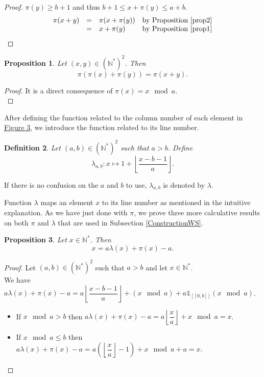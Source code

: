 \documentclass{article}
\newtheorem{definition}{Definition}[section]
\newtheorem{computational theorem}[definition]{Computational Theorem}
\newtheorem{proposition}[definition]{Proposition}
\begin{document}
\begin{proof}
\(\pi(y) \geqslant b + 1\) and thus \(b + 1 \leqslant x + \pi(y) \leqslant a + b\).
\[
\begin{array}{l l l l}
	\pi(x + y) & = & \pi(x + \pi(y)) & \text{by Proposition \ref{prop2}} \\
	 & = & x + \pi(y) & \text{by Proposition \ref{prop1}}
\end{array}
\]
\end{proof}

\begin{proposition}
\label{prop4}
Let \((x,y)\in (\mathbb{N}^*)^2\). Then
\[
\pi(\pi(x)+\pi(y))=\pi(x+y).
\]
\end{proposition}

\begin{proof}
It is a direct consequence of \(\pi(x) = x \mod a\). \\
\end{proof}

After defining the function related to the column number of each element in \hyperref[SchemaWS]{Figure 3},
we introduce the function related to its line number.

\begin{definition}
Let \((a,b) \in (\mathbb{N}^*)^2\) such that \(a>b\). Define
\[ \lambda_{a,b}:x \longmapsto 1+ \left\lfloor\dfrac{x-b-1}{a}\right\rfloor.\]
\end{definition}

If there is no confusion on the \(a\) and \(b\) to use, \(\lambda_{a, b}\) is denoted by \(\lambda\).

Function \(\lambda\) maps an element \(x\) to its line number as mentioned in the intuitive explanation.
As we have just done with \(\pi\), we prove three more calculative results on both \(\pi\) and \(\lambda\) that are used in
Subsection \ref{ConstructionWS}.

\begin{proposition}
\label{prop5}
Let \(x\in \mathbb{N}^*\). Then
\[
x=a\lambda(x)+\pi(x)-a.
\]
\end{proposition}

\begin{proof}
Let \((a,b)\in (\mathbb{N}^*)^2\) such that \(a>b\) and let \(x\in \mathbb{N}^*\). \\
We have \(a\lambda(x)+\pi(x)-a=a\left\lfloor\dfrac{x-b-1}{a}\right\rfloor+(x \mod a)+ a \mathds{1}_{ [\![0,b]\!]}(x \mod a)\).

\begin{itemize}
\item If \(x \mod a>b\) then \(a\lambda(x)+\pi(x)-a=a\left\lfloor\dfrac{x}{a}\right\rfloor+x \mod a=x\).
\item If \(x \mod a \leqslant b\) then \(a\lambda(x)+\pi(x)-a=a \left( \left \lfloor \dfrac{x}{a} \right \rfloor - 1 \right)+x \mod a +a=x\).
\end{itemize}
\end{proof}
\end{document}
